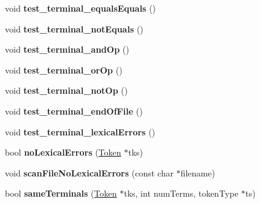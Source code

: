 \begin{DoxyCompactItemize}
\item 
\hypertarget{classScannerTestSuite_a4a15e77f16d68048c1a86ae078be2833}{void {\bfseries test\-\_\-terminal\-\_\-equals\-Equals} ()}\label{classScannerTestSuite_a4a15e77f16d68048c1a86ae078be2833}

\item 
\hypertarget{classScannerTestSuite_ac5ef06e31af6d84f45562beeae37cc0c}{void {\bfseries test\-\_\-terminal\-\_\-not\-Equals} ()}\label{classScannerTestSuite_ac5ef06e31af6d84f45562beeae37cc0c}

\item 
\hypertarget{classScannerTestSuite_ac59bf938e379950259fe3dcd7b49fc8e}{void {\bfseries test\-\_\-terminal\-\_\-and\-Op} ()}\label{classScannerTestSuite_ac59bf938e379950259fe3dcd7b49fc8e}

\item 
\hypertarget{classScannerTestSuite_a419f8b30aa9afc64a53dddac255429c2}{void {\bfseries test\-\_\-terminal\-\_\-or\-Op} ()}\label{classScannerTestSuite_a419f8b30aa9afc64a53dddac255429c2}

\item 
\hypertarget{classScannerTestSuite_a188e5bdd91f633e072957fd4e4944522}{void {\bfseries test\-\_\-terminal\-\_\-not\-Op} ()}\label{classScannerTestSuite_a188e5bdd91f633e072957fd4e4944522}

\item 
\hypertarget{classScannerTestSuite_a92d40fe62e39360d160944ee13d83b81}{void {\bfseries test\-\_\-terminal\-\_\-end\-Of\-File} ()}\label{classScannerTestSuite_a92d40fe62e39360d160944ee13d83b81}

\item 
\hypertarget{classScannerTestSuite_a07dd0887b70ab7b40539cdef4d342ede}{void {\bfseries test\-\_\-terminal\-\_\-lexical\-Errors} ()}\label{classScannerTestSuite_a07dd0887b70ab7b40539cdef4d342ede}

\item 
\hypertarget{classScannerTestSuite_a681db679ec2418f862f478fa7678942b}{bool {\bfseries no\-Lexical\-Errors} (\hyperlink{classToken}{Token} $\ast$tks)}\label{classScannerTestSuite_a681db679ec2418f862f478fa7678942b}

\item 
\hypertarget{classScannerTestSuite_a01dc6065a02127accc049627ae234129}{void {\bfseries scan\-File\-No\-Lexical\-Errors} (const char $\ast$filename)}\label{classScannerTestSuite_a01dc6065a02127accc049627ae234129}

\item 
\hypertarget{classScannerTestSuite_a97c50725866b3a5b36c36488053a59bc}{bool {\bfseries same\-Terminals} (\hyperlink{classToken}{Token} $\ast$tks, int num\-Terms, token\-Type $\ast$ts)}\label{classScannerTestSuite_a97c50725866b3a5b36c36488053a59bc}


\end{DoxyCompactItemize}
